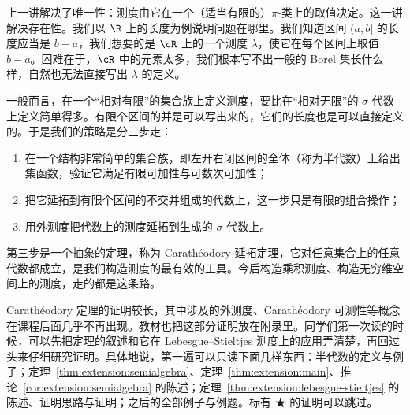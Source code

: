 \label{lec:extension-of-measures}

上一讲解决了唯一性：测度由它在一个（适当有限的）$\pi$-类上的取值决定。这一讲解决存在性。我们以 $\R$ 上的长度为例说明问题在哪里。我们知道区间 $(a,b]$ 的长度应当是 $b-a$，我们想要的是 $\cR$ 上的一个测度 $\lambda$，使它在每个区间上取值 $b-a$。困难在于，$\cR$ 中的元素太多，我们根本写不出一般的 Borel 集长什么样，自然也无法直接写出 $\lambda$ 的定义。

一般而言，在一个“相对有限”的集合族上定义测度，要比在“相对无限”的 $\sigma$-代数上定义简单得多。有限个区间的并是可以写出来的，它们的长度也是可以直接定义的。于是我们的策略是分三步走：
\begin{enumerate}
\item 在一个结构非常简单的集合族，即左开右闭区间的全体（称为半代数）上给出集函数，验证它满足有限可加性与可数次可加性；
\item 把它延拓到有限个区间的不交并组成的代数上，这一步只是有限的组合操作；
\item 用外测度把代数上的测度延拓到生成的 $\sigma$-代数上。
\end{enumerate}
第三步是一个抽象的定理，称为 Carathéodory 延拓定理，它对任意集合上的任意代数都成立，是我们构造测度的最有效的工具。今后构造乘积测度、构造无穷维空间上的测度，走的都是这条路。

Carathéodory 定理的证明较长，其中涉及的外测度、Carathéodory 可测性等概念在课程后面几乎不再出现。教材也把这部分证明放在附录里。同学们第一次读的时候，可以先把定理的叙述和它在 Lebesgue--Stieltjes 测度上的应用弄清楚，再回过头来仔细研究证明。具体地说，第一遍可以只读下面几样东西：半代数的定义与例子；定理~\ref{thm:extension:semialgebra}、定理~\ref{thm:extension:main}、推论~\ref{cor:extension:semialgebra} 的陈述；定理~\ref{thm:extension:lebesgue-stieltjes} 的陈述、证明思路与证明；之后的全部例子与例题。标有 ★ 的证明可以跳过。


